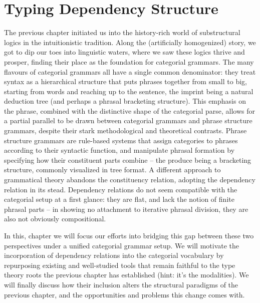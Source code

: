 \chapter{Typing Dependency Structure}
\label{chapter:chapter_2}


The previous chapter initiated us into the history-rich world of substructural logics in the intuitionistic tradition.
Along the (artificially homogenized) story, we got to dip our toes into linguistic waters, where we saw these logics thrive and prosper, finding their place as the foundation for categorial grammars.
The many flavours of categorial grammars all have a single common denominator: they treat syntax as a hierarchical structure that puts phrases together from small to big, starting from words and reaching up to the sentence, the imprint being a natural deduction tree (and perhaps a phrasal bracketing structure).
This emphasis on the phrase, combined with the distinctive shape of the categorial parse, allows for a partial parallel to be drawn between categorial grammars and phrase structure grammars, despite their stark methodological and theoretical contrasts.
Phrase structure grammars are rule-based systems that assign categories to phrases according to their syntactic function, and manipulate phrasal formation by specifying how their constituent parts combine -- the produce being a bracketing structure, commonly visualized in tree format.
A different approach to grammatical theory abandons the constituency relation, adopting the dependency relation in its stead.
Dependency relations do not seem compatible with the categorial setup at a first glance: they are flat, and lack the notion of finite phrasal parts -- in showing no attachment to iterative phrasal division, they are also not obviously compositional.

In this, chapter we will focus our efforts into bridging this gap between these two perspectives under a unified categorial grammar setup.
We will motivate the incorporation of dependency relations into the categorial vocabulary by repurposing existing and well-studied tools that remain faithful to the type theory roots the previous chapter has established (hint: it's the modalities).
We will finally discuss how their inclusion alters the structural paradigms of the previous chapter, and the opportunities and problems this change comes with.

